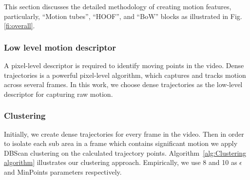 This section discusses the detailed methodology of creating motion features, particularly, ``Motion tubes'', ``HOOF'', and ``BoW'' blocks as illustrated in Fig. \ref{fi:overall}.

\subsubsection{Low level motion descriptor}
A pixel-level descriptor is required to identify moving points in the video. Dense trajectories \cite{wang2011action} is a powerful
pixel-level algorithm, which captures and tracks motion across several frames. In this work,
we choose dense trajectories as the low-level descriptor for capturing raw motion.

\subsubsection{Clustering}

Initially, we create dense trajectories for every frame in the video.
Then in order to isolate each sub area in a frame which contains significant motion we apply DBScan clustering on the calculated trajectory points.
Algorithm~\ref{alg:Clustering algorithm}  illustrates our clustering approach. Empirically, we use 8 and 10 as $\epsilon$ and MinPoints parameters respectively.


